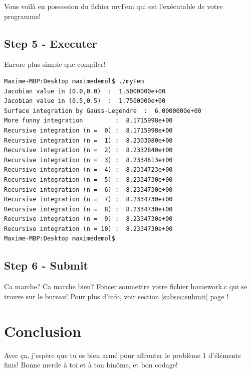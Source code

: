 \documentclass[11pt,a4paper]{article}
\begin{document}
Vous voilà en possession du fichier myFem qui est l'exécutable de votre programme!

\subsection{Step 5 - Executer}

Encore plus simple que compiler!

\begin{lstlisting}[style=Bash]
Maxime-MBP:Desktop maximedemol$ ./myFem
Jacobian value in (0.0,0.0)  :  1.5000000e+00 
Jacobian value in (0.5,0.5)  :  1.7500000e+00 
Surface integration by Gauss-Legendre  :  6.0000000e+00 
More funny integration         :  8.1715998e+00 
Recursive integration (n =  0) :  8.1715998e+00 
Recursive integration (n =  1) :  8.2303080e+00 
Recursive integration (n =  2) :  8.2332840e+00 
Recursive integration (n =  3) :  8.2334613e+00 
Recursive integration (n =  4) :  8.2334723e+00 
Recursive integration (n =  5) :  8.2334730e+00 
Recursive integration (n =  6) :  8.2334730e+00 
Recursive integration (n =  7) :  8.2334730e+00 
Recursive integration (n =  8) :  8.2334730e+00 
Recursive integration (n =  9) :  8.2334730e+00 
Recursive integration (n = 10) :  8.2334730e+00 
Maxime-MBP:Desktop maximedemol$ 
\end{lstlisting}
\vspace{12pt}

\subsection{Step 6 - Submit}

Ca marche? Ca marche bien? Foncer soumettre votre fichier homework.c qui se trouve sur le bureau! Pour plus d'info, voir section \ref{subsec:submit} page \pageref{subsec:submit}!

\section{Conclusion}

Avec ça, j'espère que tu es bien armé pour affronter le problème 1 d'éléments finis! Bonne merde à toi et à ton binôme, et bon codage!
\end{document}
